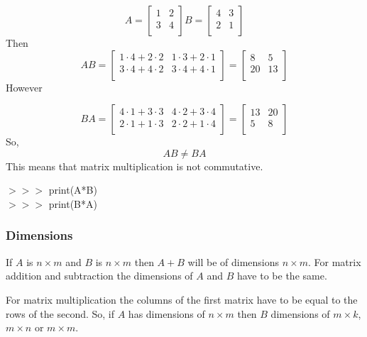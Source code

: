 \documentclass{beamer}
\begin{document}
\begin{frame}
\[A=
\begin{bmatrix}
	1 & 2 \\
	3 & 4\\
\end{bmatrix}
B=
\begin{bmatrix}
	4 & 3\\
	2 & 1\\
\end{bmatrix}
\]
Then 
\[
AB=
\begin{bmatrix}
	1\cdot 4 +2\cdot 2& 1\cdot 3+ 2\cdot 1\\
	3\cdot 4+4\cdot 2 & 3\cdot 4+4\cdot 1 \\
\end{bmatrix}
=
\begin{bmatrix}
	8& 5\\
	20 & 13\\	
\end{bmatrix}
\]
However


\[
BA=
\begin{bmatrix}
	4\cdot 1 +3\cdot 3& 4\cdot 2+ 3\cdot 4\\
	2\cdot 1+1\cdot 3 & 2\cdot 2+1\cdot 4 \\
\end{bmatrix}
=
\begin{bmatrix}
	13& 20\\
	5& 8\\	
\end{bmatrix}
\]
So, $$AB\neq BA$$
This means that matrix multiplication is not commutative. 
\end{frame}
\begin{frame}
\begin{example}[code]

$>>>$ print(A*B)\\
$>>>$ print(B*A)
\end{example}
\end{frame}
\begin{frame}
\frametitle{Dimensions}
If $A$ is $n\times m$ and $B$ is $n\times m$ then $A+B$ will be of dimensions $n\times m$. For matrix addition and subtraction the dimensions of $A$ and $B$ have to be the same. 
$$$$

For matrix multiplication the columns of the first matrix have to be equal to the rows of the second.  So, if $A$ has dimensions of $n\times m$ then $B$ dimensions of $m\times k$, $m\times n$ or $m\times m$.
\end{frame}
\end{document}
